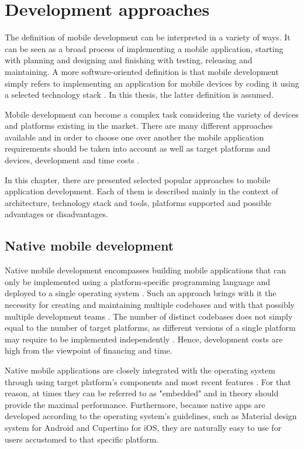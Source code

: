 
\section{Development approaches}

The definition of mobile development can be interpreted in a variety of ways. It can be seen as a broad process of implementing a mobile application, starting with planning and designing and finishing with testing, releasing and maintaining. A more software-oriented definition is that mobile development simply refers to implementing an application for mobile devices by coding it using a selected technology stack \cite{microsoft_mobile_development}. In this thesis, the latter definition is assumed.

Mobile development can become a complex task considering the variety of devices and platforms existing in the market. There are many different approaches available and in order to choose one over another the mobile application requirements should be taken into account as well as target platforms and devices, development and time costs \cite{velvetech_mobile_dev_approaches}.

In this chapter, there are presented selected popular approaches to mobile application development. Each of them is described mainly in the context of architecture, technology stack and tools, platforms supported and possible advantages or disadvantages.

\subsection{Native mobile development}

Native mobile development encompasses building mobile applications that can only be implemented using a platform-specific programming language and deployed to a single operating system \cite{comparative_analysis_native_hybrid}. Such an approach brings with it the necessity for creating and maintaining multiple codebases and with that possibly multiple development teams \cite{approach_to_assess_performance_case_study}. The number of distinct codebases does not simply equal to the number of target platforms, as different versions of a single platform may require to be implemented independently \cite{appdynamics_mobile_app_performance}. Hence, development costs are high from the viewpoint of financing and time.

Native mobile applications are closely integrated with the operating system through using target platform's components \cite{comparison_perf_looks_flutter_native}\cite{comp_analysis_hybrid_frameworks} and most recent features \cite{eval_rn_flutter}. For that reason, at times they can be referred to as "embedded" 
 \cite{cross_platform_development_study_rn_flutter} and in theory should provide the maximal performance. Furthermore, because native apps are developed according to the operating system's guidelines, such as Material design system for Android and Cupertino for iOS, they are naturally easy to use for users accustomed to that specific platform.

